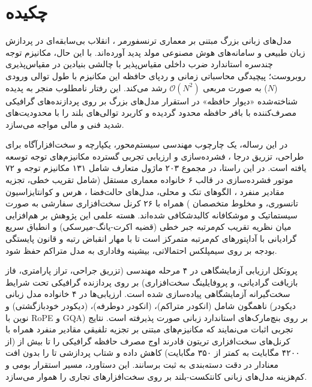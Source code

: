 \documentclass[12pt,a4paper]{report}
\theoremstyle{definition}
\begin{document}
\chapter*{چکیده}
مدل‌های زبانی بزرگ مبتنی بر معماری ترنسفورمر ، انقلاب بی‌سابقه‌ای در پردازش زبان طبیعی و سامانه‌های هوش مصنوعی مولد پدید آورده‌اند. با این حال، مکانیزم توجه چندسره استاندارد ضرب داخلی مقیاس‌پذیر  با چالشی بنیادین در مقیاس‌پذیری روبروست؛ پیچیدگی محاسباتی زمانی و ردپای حافظه این مکانیزم با طول توالی ورودی ($N$) به صورت مربعی $\mathcal{O}(N^2)$ رشد می‌کند. این رفتار نامطلوب منجر به پدیده شناخته‌شده «دیوار حافظه»  در استقرار مدل‌های بزرگ بر روی پردازنده‌های گرافیکی مصرف‌کننده  با بافر حافظه محدود  گردیده و کاربرد توالی‌های بلند را با محدودیت‌های شدید فنی و مالی مواجه می‌سازد.

در این رساله، یک چارچوب مهندسی سیستم‌محور، یکپارچه و سخت‌افزارآگاه برای طراحی، تزریق درجا ، فشرده‌سازی و ارزیابی تجربی گسترده مکانیزم‌های توجه توسعه یافته است. در این راستا، در مجموع ۲۰۳ ماژول متعارف شامل ۱۳۱ مکانیزم توجه و ۷۲ موتور فشرده‌سازی در قالب ۶ خانواده معماری مستقل (شامل تقریب خطی، تجزیه مقادیر منفرد ، الگوهای تنک و محلی، مدل‌های حالت‌فضا ، هرس و کوانتایزاسیون تانسوری، و مخلوط متخصصان ) همراه با ۲۶ کرنل سخت‌افزاری سفارشی  به صورت سیستماتیک و موشکافانه کالبدشکافی شده‌اند. هسته علمی این پژوهش بر هم‌افزایی میان نظریه تقریب کم‌مرتبه جبر خطی (قضیه اکرت-یانگ-میرسکی) و انطباق سریع گرادیانی با آداپتورهای کم‌مرتبه  متمرکز است تا با مهار انقباض رتبه  و قانون پایستگی بودجه بر روی سیمپلکس احتمالاتی، بیشینه وفاداری به مدل متراکم حفظ شود.

پروتکل ارزیابی آزمایشگاهی در ۴ مرحله مهندسی (تزریق جراحی، تراز پارامتری، فاز بازیافت گرادیانی، و پروفایلینگ سخت‌افزاری) بر روی پردازنده گرافیکی  تحت شرایط سخت‌گیرانه آزمایشگاهی پیاده‌سازی شده است. ارزیابی‌ها در ۴ خانواده مدل زبانی ناهمگون شامل  (انکودر متراکم)،  (انکودر دوطرفه)،  (دیکودر خودبازگشتی) و  (دیکودر نوین با RoPE و GQA) بر روی بنچ‌مارک‌های استاندارد زبانی صورت پذیرفته است. نتایج تجربی اثبات می‌نمایند که مکانیزم‌های مبتنی بر تجزیه تلفیقی مقادیر منفرد همراه با کرنل‌های سخت‌افزاری تریتون قادرند اوج مصرف حافظه گرافیکی را تا بیش از  (از ۴۲۰۰ مگابایت به کمتر از ۳۵۰ مگابایت) کاهش داده و شتاب پردازشی  تا  را بدون افت معنادار در دقت دسته‌بندی  به ثبت برسانند. این دستاورد، مسیر استقرار بومی و کم‌هزینه مدل‌های زبانی کانتکست-بلند بر روی سخت‌افزارهای تجاری را هموار می‌سازد.
\end{document}
